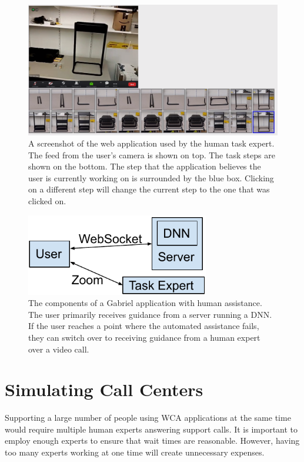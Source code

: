 \begin{figure}[H]
  \includegraphics[width=\textwidth]{figures/expert_ui.png}
  \caption{A screenshot of the web application used by the human task expert.
    The feed from the user's camera is shown on top. The task steps are shown on
    the bottom. The step that the application believes the user is currently
    working on is surrounded by the
    blue box. Clicking on a different step will change the current step
    to the one that was clicked on.
  }\label{fig:expertui}
\end{figure}

\begin{figure}[H]
  \includegraphics[width=8cm]{figures/human_assitance.pdf}
  \caption{The components of a Gabriel application with human assistance. The
    user primarily receives guidance from a server running a DNN. If the user
    reaches a point where the automated assistance fails, they can switch over
    to receiving guidance from a human expert over a video call.
  }\label{fig:expert_components}
\end{figure}

\section{Simulating Call Centers}

Supporting a large number of people using WCA applications at the same time
would require multiple human experts answering support calls.
It is important to employ enough experts to ensure that wait times are
reasonable.
However, having too many experts working at one time will create unnecessary
expenses.

